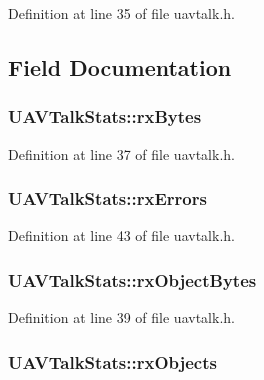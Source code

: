 Definition at line 35 of file uavtalk.\-h.



\subsection{Field Documentation}
\hypertarget{struct_u_a_v_talk_stats_af98fb7a9d72619f9ad84628b20ffcbdf}{
\subsubsection[{rx\-Bytes}]{ U\-A\-V\-Talk\-Stats\-::rx\-Bytes}}\label{struct_u_a_v_talk_stats_af98fb7a9d72619f9ad84628b20ffcbdf}


Definition at line 37 of file uavtalk.\-h.

\hypertarget{struct_u_a_v_talk_stats_a0496877af8f1ce9110b2b42a58956e10}{
\subsubsection[{rx\-Errors}]{ U\-A\-V\-Talk\-Stats\-::rx\-Errors}}\label{struct_u_a_v_talk_stats_a0496877af8f1ce9110b2b42a58956e10}


Definition at line 43 of file uavtalk.\-h.

\hypertarget{struct_u_a_v_talk_stats_a5adb8d84e7dfe9f3aa1a03a6c057f2fd}{
\subsubsection[{rx\-Object\-Bytes}]{ U\-A\-V\-Talk\-Stats\-::rx\-Object\-Bytes}}\label{struct_u_a_v_talk_stats_a5adb8d84e7dfe9f3aa1a03a6c057f2fd}


Definition at line 39 of file uavtalk.\-h.

\hypertarget{struct_u_a_v_talk_stats_abe87f216fd1bb8fdb474a61d467d7b41}{
\subsubsection[{rx\-Objects}]{ U\-A\-V\-Talk\-Stats\-::rx\-Objects}}\label{struct_u_a_v_talk_stats_abe87f216fd1bb8fdb474a61d467d7b41}


